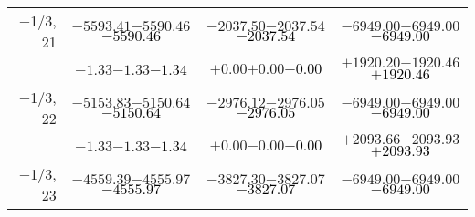 \documentclass[compress]{beamer}
\begin{document}
\begin{frame}
{\begin{tabular}{r | c | c | c}
$-$1/3, 21 & $-5593.41$\hspace{0.1 cm}$-5590.46$\hspace{0.1 cm}\textcolor{black}{$-5590.46$} & $-2037.50$\hspace{0.1 cm}$-2037.54$\hspace{0.1 cm}\textcolor{black}{$-2037.54$} & $-6949.00$\hspace{0.1 cm}$-6949.00$\hspace{0.1 cm}\textcolor{black}{$-6949.00$} \\
           & $-1.33$\hspace{0.1 cm}$-1.33$\hspace{0.1 cm}\textcolor{black}{$-1.34$} & $+0.00$\hspace{0.1 cm}$+0.00$\hspace{0.1 cm}\textcolor{black}{$+0.00$} & $+1920.20$\hspace{0.1 cm}$+1920.46$\hspace{0.1 cm}\textcolor{black}{$+1920.46$} \\
$-$1/3, 22 & $-5153.83$\hspace{0.1 cm}$-5150.64$\hspace{0.1 cm}\textcolor{black}{$-5150.64$} & $-2976.12$\hspace{0.1 cm}$-2976.05$\hspace{0.1 cm}\textcolor{black}{$-2976.05$} & $-6949.00$\hspace{0.1 cm}$-6949.00$\hspace{0.1 cm}\textcolor{black}{$-6949.00$} \\
           & $-1.33$\hspace{0.1 cm}$-1.33$\hspace{0.1 cm}\textcolor{black}{$-1.34$} & $+0.00$\hspace{0.1 cm}$-0.00$\hspace{0.1 cm}\textcolor{black}{$-0.00$} & $+2093.66$\hspace{0.1 cm}$+2093.93$\hspace{0.1 cm}\textcolor{black}{$+2093.93$} \\
$-$1/3, 23 & $-4559.39$\hspace{0.1 cm}$-4555.97$\hspace{0.1 cm}\textcolor{black}{$-4555.97$} & $-3827.30$\hspace{0.1 cm}$-3827.07$\hspace{0.1 cm}\textcolor{black}{$-3827.07$} & $-6949.00$\hspace{0.1 cm}$-6949.00$\hspace{0.1 cm}\textcolor{black}{$-6949.00$} \\

\end{tabular}}
\end{frame}
\end{document}
